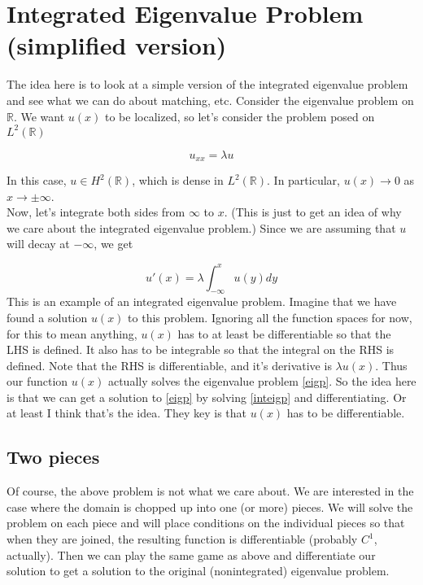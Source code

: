 \documentclass[12pt]{article}
\def\R{{\mathbb R}}
\begin{document}
\section*{Integrated Eigenvalue Problem (simplified version)}
The idea here is to look at a simple version of the integrated eigenvalue problem and see what we can do about matching, etc. Consider the eigenvalue problem on $\R$. We want $u(x)$ to be localized, so let's consider the problem posed on $L^2(\R)$

\begin{equation}\label{eigp}
	u_{xx} = \lambda u
\end{equation}

In this case, $u \in H^2(\R)$, which is dense in $L^2(\R)$. In particular, $u(x) \rightarrow 0$ as $x \rightarrow \pm \infty$. \\

Now, let's integrate both sides from $\infty$ to $x$. (This is just to get an idea of why we care about the integrated eigenvalue problem.) Since we are assuming that $u$ will decay at $-\infty$, we get

\begin{equation}\label{inteigp}
	u'(x) = \lambda \int_{-\infty}^x u(y) dy
\end{equation}
This is an example of an integrated eigenvalue problem. Imagine that we have found a solution $u(x)$ to this problem. Ignoring all the function spaces for now, for this to mean anything, $u(x)$ has to at least be differentiable so that the LHS is defined. It also has to be integrable so that the integral on the RHS is defined. Note that the RHS is differentiable, and it's derivative is $\lambda u(x)$. Thus our function $u(x)$ actually solves the eigenvalue problem \eqref{eigp}. So the idea here is that we can get a solution to \eqref{eigp} by solving \eqref{inteigp} and differentiating. Or at least I think that's the idea. They key is that $u(x)$ has to be differentiable.

\subsection*{Two pieces}
Of course, the above problem is not what we care about. We are interested in the case where the domain is chopped up into one (or more) pieces. We will solve the problem on each piece and will place conditions on the individual pieces so that when they are joined, the resulting function is differentiable (probably $C^1$, actually). Then we can play the same game as above and differentiate our solution to get a solution to the original (nonintegrated) eigenvalue problem.\\
\end{document}
